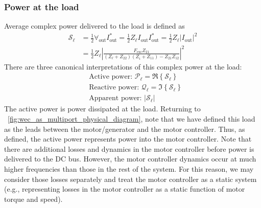 \documentclass[5p,times]{elsarticle}
\begin{document}
\subsubsection{Power at the load}\label{sec:power_at_the_load}
Average complex power delivered to the load is defined as 
\begin{equation}
\begin{aligned}
        \mathcal{S}_{\ell} &= \frac{1}{2} \forall_{\textrm{out}} I_{\textrm{out}}^* = \frac{1}{2} Z_\ell I_{\textrm{out}} I_{\textrm{out}}^* = \frac{1}{2} Z_\ell | I_{\textrm{out}} |^2 \\
        &= \frac{1}{2} Z_\ell \left| \frac{F_{\textrm{exc}} Z_{21}}{ (Z_\ell + Z_{22}) (Z_i + Z_{11}) - Z_{21} Z_{12}  } \right|^2 
\end{aligned}
\end{equation}
%
There are three canonical interpretations of this complex power at the load:
%
\begin{subequations}
\begin{align}
        &\textrm{Active power: } \mathcal{P}_{\ell} = \Re \left\{ \mathcal{S}_{\ell} \right\} \\[0.5em]
        &\textrm{Reactive power: } \mathcal{Q}_{\ell} = \Im \left\{ \mathcal{S}_{\ell} \right\} \\[0.5em]
        &\textrm{Apparent power: } | \mathcal{S}_{\ell} |
\end{align}\label{eq:load_power_types}%
\end{subequations}
%
The active power is power dissipated at the load.
Returning to \figurename~\ref{fig:wec_as_multiport_physical_diagram}, note that we have defined this load as the leads between the motor/generator and the motor controller.
Thus, as defined, the active power represents power into the motor controller.
Note that there are additional losses and dynamics in the motor controller before power is delivered to the DC bus.
However, the motor controller dynamics occur at much higher frequencies than those in the rest of the system.
For this reason, we may consider those losses separately and treat the motor controller as a static system (e.g., representing losses in the motor controller as a static function of motor torque and speed).

\end{document}
